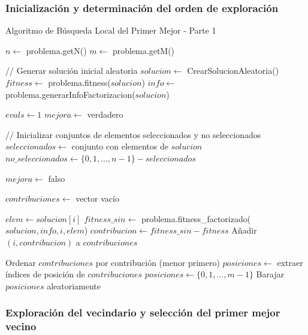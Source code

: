 \documentclass{article}
\begin{document}
\subsubsection{Inicialización y determinación del orden de exploración}

\begin{algorithm}
\caption{Algoritmo de Búsqueda Local del Primer Mejor - Parte 1}
\begin{algorithmic}[1]
    \State $n \gets$ problema.getN()
    \State $m \gets$ problema.getM()
    
    \State // Generar solución inicial aleatoria
    \State $solucion \gets$ CrearSolucionAleatoria()
    \State $fitness \gets$ problema.fitness($solucion$)
    \State $info \gets$ problema.generarInfoFactorizacion($solucion$)
    
    \State $evals \gets 1$ 
    \State $mejora \gets$ verdadero
    
    \State // Inicializar conjuntos de elementos seleccionados y no seleccionados
    \State $seleccionados \gets$ conjunto con elementos de $solucion$
    \State $no\_seleccionados \gets \{0, 1, ..., n-1\} - seleccionados$
    
        \State $mejora \gets$ falso
        
            \State $contribuciones \gets$ vector vacío
            
                \State $elem \gets solucion[i]$
                \State $fitness\_sin \gets$ problema.fitness\_factorizado($solucion, info, i, elem$)
                \State $contribucion \gets fitness\_sin - fitness$
                \State Añadir $(i, contribucion)$ a $contribuciones$
            \EndFor
            
            \State Ordenar $contribuciones$ por contribución (menor primero)
            \State $posiciones \gets$ extraer índices de posición de $contribuciones$
        \Else
            \State $posiciones \gets \{0, 1, ..., m-1\}$
            \State Barajar $posiciones$ aleatoriamente
        \EndIf
\EndFunction
\end{algorithmic}
\end{algorithm}

\newpage
\subsubsection{Exploración del vecindario y selección del primer mejor vecino}
\end{document}
